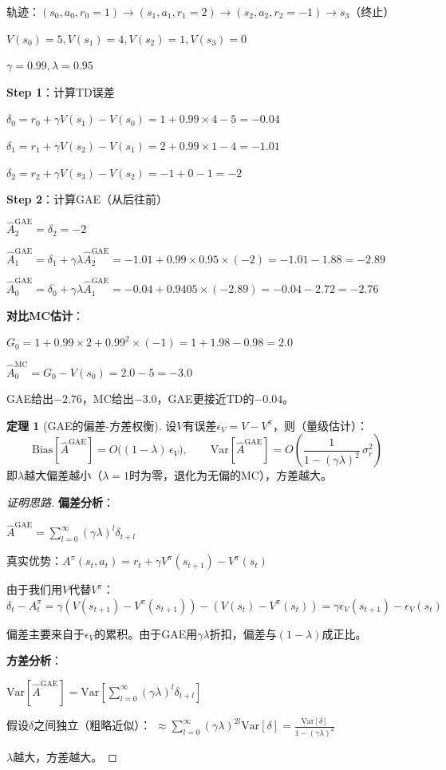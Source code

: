 \documentclass[11pt,a4paper]{article}
\theoremstyle{definition}
\newtheorem{theorem}{定理}[section]
\begin{document}
\begin{calculation}[GAE的数值例子]
轨迹：$(s_0, a_0, r_0=1) \to (s_1, a_1, r_1=2) \to (s_2, a_2, r_2=-1) \to s_3$（终止）

$V(s_0) = 5, V(s_1) = 4, V(s_2) = 1, V(s_3) = 0$

$\gamma = 0.99, \lambda = 0.95$

\textbf{Step 1}：计算TD误差

$\delta_0 = r_0 + \gamma V(s_1) - V(s_0) = 1 + 0.99 \times 4 - 5 = -0.04$

$\delta_1 = r_1 + \gamma V(s_2) - V(s_1) = 2 + 0.99 \times 1 - 4 = -1.01$

$\delta_2 = r_2 + \gamma V(s_3) - V(s_2) = -1 + 0 - 1 = -2$

\textbf{Step 2}：计算GAE（从后往前）

$\hat{A}_2^{\text{GAE}} = \delta_2 = -2$

$\hat{A}_1^{\text{GAE}} = \delta_1 + \gamma\lambda \hat{A}_2^{\text{GAE}} = -1.01 + 0.99 \times 0.95 \times (-2) = -1.01 - 1.88 = -2.89$

$\hat{A}_0^{\text{GAE}} = \delta_0 + \gamma\lambda \hat{A}_1^{\text{GAE}} = -0.04 + 0.9405 \times (-2.89) = -0.04 - 2.72 = -2.76$

\textbf{对比MC估计}：

$G_0 = 1 + 0.99 \times 2 + 0.99^2 \times (-1) = 1 + 1.98 - 0.98 = 2.0$

$\hat{A}_0^{\text{MC}} = G_0 - V(s_0) = 2.0 - 5 = -3.0$

GAE给出$-2.76$，MC给出$-3.0$，GAE更接近TD的$-0.04$。
\end{calculation}

\begin{theorem}[GAE的偏差-方差权衡]
设$V$有误差$\epsilon_V = V - V^{\pi}$，则（量级估计）：
\[
\text{Bias}[\hat{A}^{\text{GAE}}] = O\big((1-\lambda)\,\epsilon_V\big),\qquad
\text{Var}[\hat{A}^{\text{GAE}}] = O\left(\frac{1}{1-(\gamma\lambda)^2}\, \sigma_r^2\right)
\]
即$\lambda$越大偏差越小（$\lambda=1$时为零，退化为无偏的MC），方差越大。
\end{theorem}

\begin{proof}[证明思路]
\textbf{偏差分析}：

$\hat{A}^{\text{GAE}} = \sum_{l=0}^\infty (\gamma\lambda)^l \delta_{t+l}$

真实优势：$A^{\pi}(s_t, a_t) = r_t + \gamma V^{\pi}(s_{t+1}) - V^{\pi}(s_t)$

由于我们用$V$代替$V^{\pi}$：
$\delta_t - A^{\pi}_t = \gamma(V(s_{t+1}) - V^{\pi}(s_{t+1})) - (V(s_t) - V^{\pi}(s_t)) = \gamma \epsilon_V(s_{t+1}) - \epsilon_V(s_t)$

偏差主要来自于$\epsilon_V$的累积。由于GAE用$\gamma\lambda$折扣，偏差与$(1-\lambda)$成正比。

\textbf{方差分析}：

$\text{Var}[\hat{A}^{\text{GAE}}] = \text{Var}\left[\sum_{l=0}^\infty (\gamma\lambda)^l \delta_{t+l}\right]$

假设$\delta$之间独立（粗略近似）：
$\approx \sum_{l=0}^\infty (\gamma\lambda)^{2l} \text{Var}[\delta] = \frac{\text{Var}[\delta]}{1 - (\gamma\lambda)^2}$

$\lambda$越大，方差越大。
\end{proof}
\end{document}
